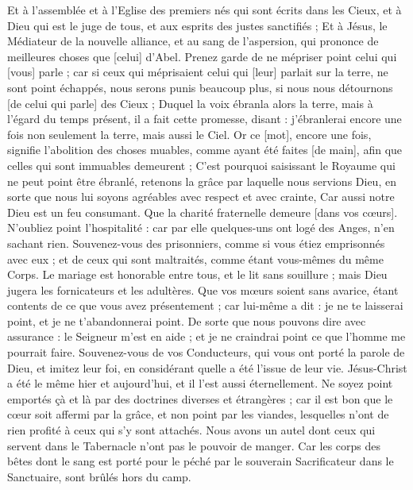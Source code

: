 \begin{multicols}{2}
Et à l'assemblée et à l'Eglise des premiers nés qui sont écrits dans les Cieux, et à Dieu qui est le juge de tous, et aux esprits des justes sanctifiés ;
Et à Jésus, le Médiateur de la nouvelle alliance, et au sang de l'aspersion, qui prononce de meilleures choses que [celui] d'Abel.
Prenez garde de ne mépriser point celui qui [vous] parle ; car si ceux qui méprisaient celui qui [leur] parlait sur la terre, ne sont point échappés, nous serons punis beaucoup plus, si nous nous détournons [de celui qui parle] des Cieux ;
Duquel la voix ébranla alors la terre, mais à l'égard du temps présent, il a fait cette promesse, disant : j'ébranlerai encore une fois non seulement la terre, mais aussi le Ciel.
Or ce [mot], encore une fois, signifie l'abolition des choses muables, comme ayant été faites [de main], afin que celles qui sont immuables demeurent ;
C'est pourquoi saisissant le Royaume qui ne peut point être ébranlé, retenons la grâce par laquelle nous servions Dieu, en sorte que nous lui soyons agréables avec respect et avec crainte,
Car aussi notre Dieu est un feu consumant.
\VerseOne{}Que la charité fraternelle demeure [dans vos cœurs].
N'oubliez point l'hospitalité : car par elle quelques-uns ont logé des Anges, n'en sachant rien.
Souvenez-vous des prisonniers, comme si vous étiez emprisonnés avec eux ; et de ceux qui sont maltraités, comme étant vous-mêmes du même Corps.
Le mariage est honorable entre tous, et le lit sans souillure ; mais Dieu jugera les fornicateurs et les adultères.
Que vos mœurs soient sans avarice, étant contents de ce que vous avez présentement ; car lui-même a dit : je ne te laisserai point, et je ne t'abandonnerai point.
De sorte que nous pouvons dire avec assurance : le Seigneur m'est en aide ; et je ne craindrai point ce que l'homme me pourrait faire.
Souvenez-vous de vos Conducteurs, qui vous ont porté la parole de Dieu, et imitez leur foi, en considérant quelle a été l'issue de leur vie.
Jésus-Christ a été le même hier et aujourd'hui, et il l'est aussi éternellement.
Ne soyez point emportés çà et là par des doctrines diverses et étrangères ; car il est bon que le cœur soit affermi par la grâce, et non point par les viandes, lesquelles n'ont de rien profité à ceux qui s'y sont attachés.
Nous avons un autel dont ceux qui servent dans le Tabernacle n'ont pas le pouvoir de manger.
Car les corps des bêtes dont le sang est porté pour le péché par le souverain Sacrificateur dans le Sanctuaire, sont brûlés hors du camp.

\end{multicols}

